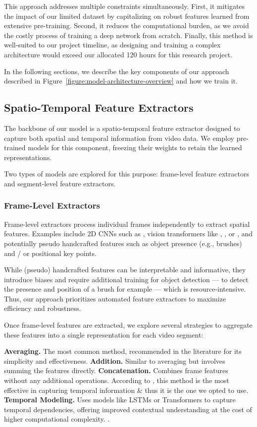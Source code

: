 This approach addresses multiple constraints simultaneously. First, it mitigates the impact of our limited dataset by capitalizing on robust features learned from extensive pre-training. Second, it reduces the computational burden, as we avoid the costly process of training a deep network from scratch. Finally, this method is well-suited to our project timeline, as designing and training a complex architecture would exceed our allocated 120 hours for this research project.

In the following sections, we describe the key components of our approach described in Figure~\ref{figure:model-architecture-overview} and how we train it.

\subsection{Spatio-Temporal Feature Extractors}
The backbone of our model is a spatio-temporal feature extractor designed to capture both spatial and temporal information from video data. We employ pre-trained models for this component, freezing their weights to retain the learned representations.

Two types of models are explored for this purpose: frame-level feature extractors and segment-level feature extractors.

\subsubsection{Frame-Level Extractors}
Frame-level extractors process individual frames independently to extract spatial features. Examples include 2D CNNs such as , vision transformers like , , or , and potentially pseudo handcrafted features such as object presence (e.g., brushes) and / or positional key points.

While (pseudo) handcrafted features can be interpretable and informative, they introduce biases and require additional training for object detection — to detect the presence and position of a brush for example — which is resource-intensive. Thus, our approach prioritizes automated feature extractors to maximize efficiency and robustness.

Once frame-level features are extracted, we explore several strategies to aggregate these features into a single representation for each video segment:

\noindent\textbf{\small{Averaging.}} The most common method, recommended in the literature \cite{dinov2} for its simplicity and effectiveness.
\noindent\textbf{\small{Addition.}} Similar to averaging but involves summing the features directly. 
\noindent\textbf{\small{Concatenation.}} Combines frame features without any additional operations. According to \cite{dinov2}, this method is the most effective in capturing temporal information \& thus it is the one we opted to use.
\noindent\textbf{\small{Temporal Modeling.}} Uses models like LSTMs or Transformers to capture temporal dependencies, offering improved contextual understanding at the cost of higher computational complexity. \cite{action-clip}.

